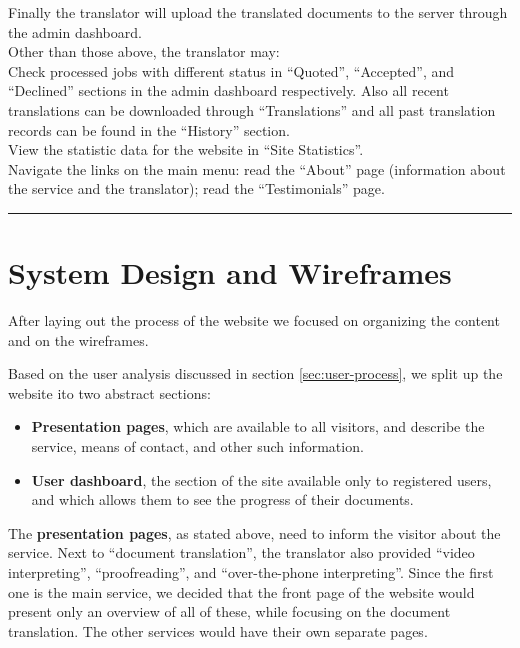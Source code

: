 \documentclass{l3proj}
\begin{document}
Finally the translator will upload the translated documents to the server through the admin dashboard.\\

Other than those above, the translator may: \\

Check processed jobs with different status in “Quoted”, “Accepted”, and “Declined” sections in the admin dashboard respectively. Also all recent translations can be downloaded through “Translations” and all past translation records can be found in the “History” section.\\

View the statistic data for the website in “Site Statistics”.\\

	Navigate the links on the main menu: read the “About” page (information about the service and the translator); read the “Testimonials” page.\\


\newpage
\rule{430pt}{1pt}


\section{System Design and Wireframes}
After laying out the process of the website we focused on organizing the content
and on the wireframes.

Based on the user analysis discussed in section \ref{sec:user-process}, we split
up the website ito two abstract sections: 
\begin{itemize}
	\item \textbf{Presentation pages}, which are available to all visitors, and
	describe the service, means of contact, and other such information.
	\item \textbf{User dashboard}, the section of the site available only to
	registered users, and which allows them to see the progress of their 
	documents.
\end{itemize}

The \textbf{presentation pages}, as stated above, need to inform the visitor
about the service. Next to ``document translation'',  the translator also provided
``video interpreting'', ``proofreading'', and ``over-the-phone interpreting''.
Since the first one is the main service, we decided that the front page of the
website would present only an overview of all of these, while focusing on the
document translation. The other services would have their own separate pages.
\end{document}
